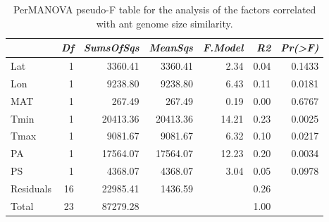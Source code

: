\begin{table}[ht]
\centering
\begin{tabular}{lrrrrrr}
  \hline
 & {\emph{Df}} & {\emph{SumsOfSqs}} & {\emph{MeanSqs}} & {\emph{F.Model}} & {\emph{R2}} & {\emph{Pr(>F)}} \\ 
  \hline
Lat & 1 & 3360.41 & 3360.41 & 2.34 & 0.04 & 0.1433 \\ 
  Lon & 1 & 9238.80 & 9238.80 & 6.43 & 0.11 & 0.0181 \\ 
  MAT & 1 & 267.49 & 267.49 & 0.19 & 0.00 & 0.6767 \\ 
  Tmin & 1 & 20413.36 & 20413.36 & 14.21 & 0.23 & 0.0025 \\ 
  Tmax & 1 & 9081.67 & 9081.67 & 6.32 & 0.10 & 0.0217 \\ 
  PA & 1 & 17564.07 & 17564.07 & 12.23 & 0.20 & 0.0034 \\ 
  PS & 1 & 4368.07 & 4368.07 & 3.04 & 0.05 & 0.0978 \\ 
  Residuals & 16 & 22985.41 & 1436.59 &  & 0.26 &  \\ 
  Total & 23 & 87279.28 &  &  & 1.00 &  \\ 
   \hline
\end{tabular}
\caption{PerMANOVA pseudo-F table for the analysis of the factors 
correlated with ant genome size similarity.} 
\label{tab:perm_size}
\end{table}
